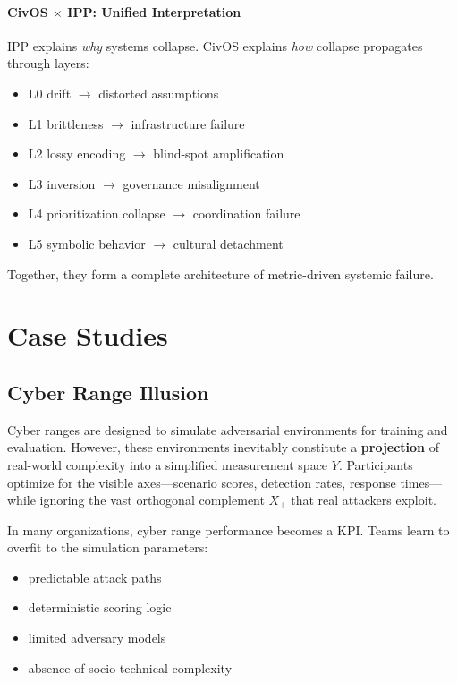 \documentclass[11pt]{article}
\begin{document}
\paragraph{CivOS $\times$ IPP: Unified Interpretation}
IPP explains \emph{why} systems collapse.
CivOS explains \emph{how} collapse propagates through layers:

\begin{itemize}[leftmargin=1.5em]
    \item L0 drift $\rightarrow$ distorted assumptions
    \item L1 brittleness $\rightarrow$ infrastructure failure
    \item L2 lossy encoding $\rightarrow$ blind-spot amplification
    \item L3 inversion $\rightarrow$ governance misalignment
    \item L4 prioritization collapse $\rightarrow$ coordination failure
    \item L5 symbolic behavior $\rightarrow$ cultural detachment
\end{itemize}

Together, they form a complete architecture of metric-driven systemic failure.

\section{Case Studies}

\subsection{Cyber Range Illusion}

Cyber ranges are designed to simulate adversarial environments for training and evaluation.
However, these environments inevitably constitute a \textbf{projection} of real-world complexity into a simplified measurement space $Y$.
Participants optimize for the visible axes---scenario scores, detection rates, response times---while ignoring the vast orthogonal complement $X_{\perp}$ that real attackers exploit.

In many organizations, cyber range performance becomes a KPI.
Teams learn to overfit to the simulation parameters:

\begin{itemize}[leftmargin=1.5em]
    \item predictable attack paths
    \item deterministic scoring logic
    \item limited adversary models
    \item absence of socio-technical complexity
\end{itemize}
\end{document}
